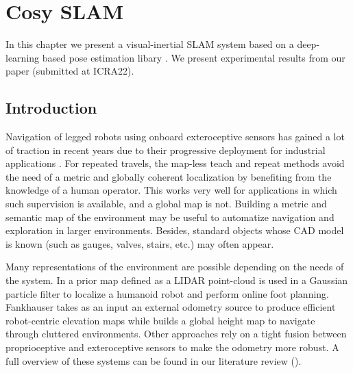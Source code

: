 \chapter{Cosy SLAM}
\label{chp:cosyslam}
\minitoc
\bigskip


In this chapter we present a visual-inertial SLAM system based on a deep-learning based pose estimation libary \cite{labbe2020cosypose}.
We present experimental results from our paper \cite{debeunne2021cosyslam} (submitted at ICRA22).

\section{Introduction}
Navigation of legged robots using onboard exteroceptive sensors has gained a lot of traction in recent years due to their progressive deployment for 
industrial applications \cite{bellicoso2018advances}. 
For repeated travels, the map-less teach and repeat methods \cite{furgale2010visual, mattamala2021learning} avoid the need of a metric and globally coherent localization 
by benefiting from the knowledge of a human operator. This works very well for applications in which such supervision is available, and a global map is not. 
Building a metric and semantic map of the environment may be useful to automatize navigation and exploration in larger environments. Besides,
standard objects whose CAD model is known (such as gauges, valves, stairs, etc.) may often appear.

Many representations of the environment are possible depending on the needs of the system. In \cite{fallon2014drift} a prior map defined as a LIDAR point-cloud is 
used in a Gaussian particle filter to localize a humanoid robot and perform online foot planning. Fankhauser \cite{fankhauser2014robot} takes as an input 
an external odometry source to produce efficient robot-centric elevation maps while \cite{kim2020vision} builds a global height map to navigate through cluttered 
environments. Other approaches \cite{wisth2021vilens} rely on a tight fusion between proprioceptive and exteroceptive sensors to make the odometry more robust. 
A full overview of these systems can be found in our literature review ().

